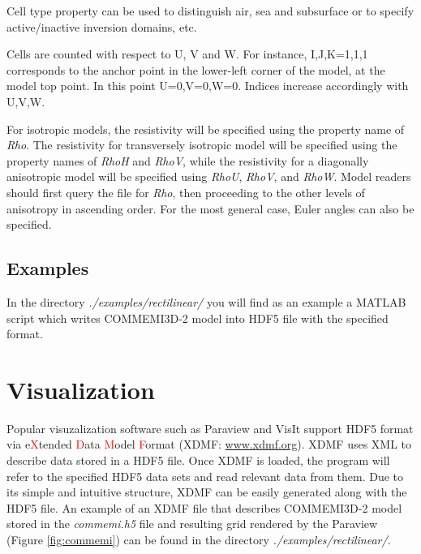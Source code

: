 \documentclass[10pt,a4paper]{article}
\begin{document}
Cell type property can be used to distinguish air, sea and subsurface or to specify active/inactive inversion domains, etc. 

Cells are counted with respect to U, V and W. For instance, I,J,K=1,1,1 corresponds to the anchor point in the lower-left corner of the model, at the model top point. In this point U=0,V=0,W=0. Indices increase accordingly with U,V,W.

For isotropic models, the resistivity will be specified using the property name of \textsl{Rho}. The resistivity for transversely isotropic model will be specified using the property names of \textit{RhoH} and \textit{RhoV}, while the resistivity for a diagonally anisotropic model will be specified using \textit{RhoU}, \textit{RhoV}, and \textit{RhoW}. Model readers should first query the file for \textit{Rho}, then proceeding to the other levels of anisotropy in ascending order. For the most general case, Euler angles can also be specified.

\subsection{Examples}

In the directory \textit{./examples/rectilinear/} you will find as an example a MATLAB script which writes COMMEMI3D-2 model into HDF5 file with the specified format.

\section{Visualization}

Popular visuzalization software such as Paraview and VisIt support HDF5 format via e\textcolor{red}{X}tended \textcolor{red}{D}ata \textcolor{red}{M}odel \textcolor{red}{F}ormat (XDMF: \textcolor[rgb]{0,0,1}{\underline{www.xdmf.org}}). XDMF uses XML to describe data stored in a HDF5 file. Once XDMF is loaded, the program will refer to the specified HDF5 data sets and read relevant data from them. Due to its simple and intuitive structure, XDMF can be easily generated along with the HDF5 file. An example of an XDMF file that describes COMMEMI3D-2 model stored in the \textit{commemi.h5} file and resulting grid rendered by the Paraview (Figure \ref{fig:commemi}) can be found in the directory \textit{./examples/rectilinear/}.
\end{document}
